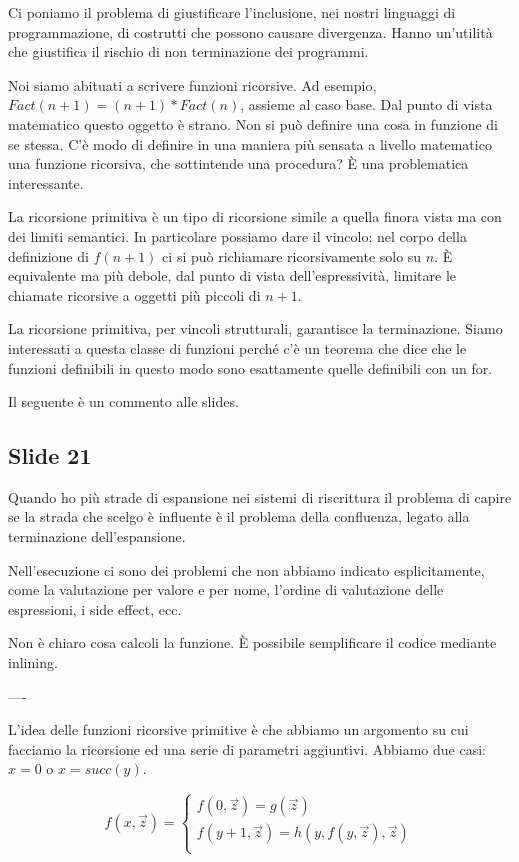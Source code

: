 Ci poniamo il problema di giustificare l'inclusione, nei nostri linguaggi di programmazione, di
costrutti che possono causare divergenza. Hanno un'utilità che giustifica il rischio di non
terminazione dei programmi.

Noi siamo abituati a scrivere funzioni ricorsive. Ad esempio, $\textit{Fact}(n+1) =
(n+1)*\textit{Fact}(n)$, assieme al caso base. Dal punto di vista matematico questo oggetto è
strano. Non si può definire una cosa in funzione di se stessa. C'è modo di definire in una maniera
più sensata a livello matematico una funzione ricorsiva, che sottintende una procedura? È una
problematica interessante.

La ricorsione primitiva è un tipo di ricorsione simile a quella finora vista ma con dei limiti
semantici. In particolare possiamo dare il vincolo: nel corpo della definizione di $f(n+1)$ ci si
può richiamare ricorsivamente solo su $n$. È equivalente ma più debole, dal punto di vista
dell'espressività, limitare le chiamate ricorsive a oggetti più piccoli di $n+1$.

La ricorsione primitiva, per vincoli strutturali, garantisce la terminazione. Siamo interessati a
questa classe di funzioni perché c'è un teorema che dice che le funzioni definibili in questo modo
sono esattamente quelle definibili con un for.

Il seguente è un commento alle slides.

\subsection{Slide 21}

Quando ho più strade di espansione nei sistemi di riscrittura il problema di capire se la strada
che scelgo è influente è il problema della confluenza, legato alla terminazione dell'espansione.

Nell'esecuzione ci sono dei problemi che non abbiamo indicato esplicitamente, come la valutazione
per valore e per nome, l'ordine di valutazione delle espressioni, i side effect, ecc.

Non è chiaro cosa calcoli la funzione. È possibile semplificare il codice mediante inlining.

----

L'idea delle funzioni ricorsive primitive è che abbiamo un argomento su cui facciamo la ricorsione
ed una serie di parametri aggiuntivi. Abbiamo due casi: $x = 0$ o $x = \textit{succ}(y)$.

\begin{equation*}
    f(x,\vec{z}) = 
    \begin{cases}
        f(0,\vec{z}) = g(\vec{z}) \\
        f(y+1,\vec{z}) = h(y,f(y,\vec{z}),\vec{z}) \\
    \end{cases}
\end{equation*}

